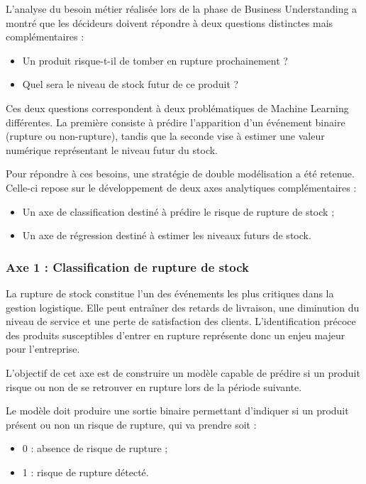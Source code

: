 L'analyse du besoin métier réalisée lors de la phase de Business Understanding a montré que les décideurs doivent répondre à deux questions distinctes mais complémentaires :
 
\begin{itemize}
    \item Un produit risque-t-il de tomber en rupture prochainement ?
    \item Quel sera le niveau de stock futur de ce produit ?
\end{itemize}
 
Ces deux questions correspondent à deux problématiques de Machine Learning différentes. La première consiste à prédire l'apparition d'un événement binaire (rupture ou non-rupture), tandis que la seconde vise à estimer une valeur numérique représentant le niveau futur du stock.
 
Pour répondre à ces besoins, une stratégie de double modélisation a été retenue. Celle-ci repose sur le développement de deux axes analytiques complémentaires :
 
\begin{itemize}
    \item Un axe de classification destiné à prédire le risque de rupture de stock ;
    \item Un axe de régression destiné à estimer les niveaux futurs de stock.
\end{itemize}
 
\subsubsection{Axe 1 : Classification de rupture de stock}
 
La rupture de stock constitue l'un des événements les plus critiques dans la gestion logistique. Elle peut entraîner des retards de livraison, une diminution du niveau de service et une perte de satisfaction des clients. L'identification précoce des produits susceptibles d'entrer en rupture représente donc un enjeu majeur pour l'entreprise.
 
L'objectif de cet axe est de construire un modèle capable de prédire si un produit risque ou non de se retrouver en rupture lors de la période suivante.
 
Le modèle doit produire une sortie binaire permettant d'indiquer si un produit présent ou non un risque de rupture, qui va prendre soit :
 
\begin{itemize}
    \item 0 : absence de risque de rupture ;
    \item 1 : risque de rupture détecté.
\end{itemize}
 
